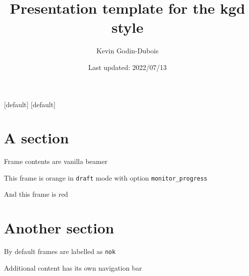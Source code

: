 \documentclass[
auto_sections,      %
monitor_progress,   %
draft               %
]{mannbeamer}
\title{Presentation template for the kgd style}
\author{Kevin Godin-Dubois}
\date{Last updated: 2022/07/13}
\begin{document}
\def\miniframestyle{default} %
[\miniframestyle]
[\miniframestyle]


\newenvironment{tinyeq}{\begingroup\tiny\csname align*\endcsname}{\csname endalign*\endcsname\endgroup}


\begin{notes} %
\end{notes}

\dotitlepage

\section{A section}
\begin{frame}[duration=1 min, ok]
 Frame contents are vanilla beamer
\end{frame}
\begin{frame}[duration=30 s, hok]
 This frame is orange in \texttt{draft} mode with option \texttt{monitor\_progress}
\end{frame}
\begin{frame}[duration=1 min 30, nok]
 And this frame is red
\end{frame}

\section{Another section}
\begin{frame}[duration=1 min 30]
 By default frames are labelled as \texttt{nok}
\end{frame}


\pageatend

\begin{frame}[ok]
 Additional content has its own navigation bar
\end{frame}
\end{document}
